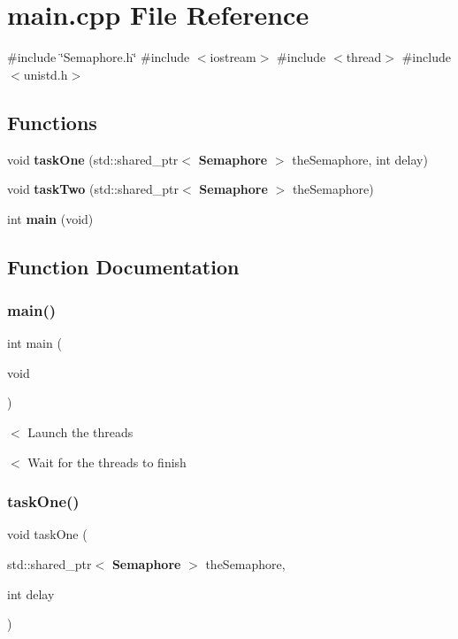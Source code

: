 \section{main.\+cpp File Reference}
\label{main_8cpp}
{\ttfamily \#include \char`\"{}Semaphore.\+h\char`\"{}}\newline
{\ttfamily \#include $<$iostream$>$}\newline
{\ttfamily \#include $<$thread$>$}\newline
{\ttfamily \#include $<$unistd.\+h$>$}\newline
\subsection*{Functions}
\begin{DoxyCompactItemize}
\item 
void \textbf{ task\+One} (std\+::shared\+\_\+ptr$<$ \textbf{ Semaphore} $>$ the\+Semaphore, int delay)
\item 
void \textbf{ task\+Two} (std\+::shared\+\_\+ptr$<$ \textbf{ Semaphore} $>$ the\+Semaphore)
\item 
int \textbf{ main} (void)
\end{DoxyCompactItemize}


\subsection{Function Documentation}
\mbox{\label{main_8cpp_a840291bc02cba5474a4cb46a9b9566fe}} 
\subsubsection{main()}
{\footnotesize\ttfamily int main (\begin{DoxyParamCaption}\item[{void}]{ }\end{DoxyParamCaption})}

$<$ Launch the threads

$<$ Wait for the threads to finish \mbox{\label{main_8cpp_a2b4729d561c345111ccab970fe11e229}} 
\subsubsection{task\+One()}
{\footnotesize\ttfamily void task\+One (\begin{DoxyParamCaption}\item[{std\+::shared\+\_\+ptr$<$ \textbf{ Semaphore} $>$}]{the\+Semaphore,  }\item[{int}]{delay }\end{DoxyParamCaption})}

